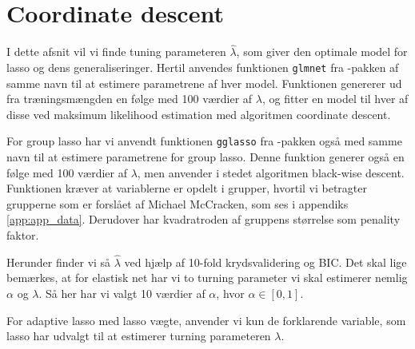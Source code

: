 \section{Coordinate descent}
I dette afsnit vil vi finde tuning parameteren $\widehat\lambda$, som giver den optimale model for lasso og dens generaliseringer. 
Hertil anvendes funktionen \texttt{glmnet} fra \Rlang-pakken af samme navn til at estimere parametrene af hver model. 
Funktionen genererer ud fra træningsmængden en følge med 100 værdier af $\lambda$, og fitter en model til hver af disse ved maksimum likelihood estimation med algoritmen coordinate descent. 

For group lasso har vi anvendt funktionen \texttt{gglasso} fra \Rlang-pakken også med samme navn til at estimere parametrene for group lasso. 
Denne funktion generer også en følge med 100 værdier af $\lambda$, men anvender i stedet algoritmen black-wise descent. 
Funktionen kræver at variablerne er opdelt i grupper, hvortil vi betragter grupperne som er forslået af Michael McCracken, som ses i appendiks \ref{app:app_data}. 
Derudover har kvadratroden af gruppens størrelse som penality faktor.

Herunder finder vi så $\widehat\lambda$ ved hjælp af 10-fold krydsvalidering og BIC. 
Det skal lige bemærkes, at for elastisk net har vi to turning parameter vi skal estimerer nemlig $\alpha$ og $\lambda$.  Så her har vi valgt 10 værdier af $\alpha$, hvor $\alpha \in [0,1]$. 

For adaptive lasso med lasso vægte, anvender vi kun de forklarende variable, som lasso har udvalgt til at estimerer turning parameteren $\lambda$. 






